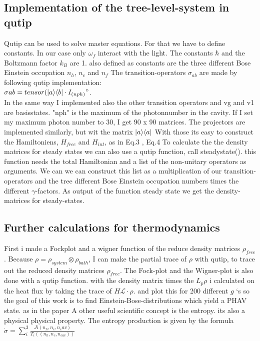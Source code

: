 \documentclass[12pt,a4paper]{article}
\DeclarePairedDelimiter\bra{\langle}{\rvert}
\DeclarePairedDelimiter\ket{\lvert}{\rangle}
\begin{document}
\subsection{Implementation of the tree-level-system in qutip}
Qutip can be used to solve master equations. For that we have to define constants.  
In our case only $\omega_f$ interact with the light. 
The constants $\hbar $ and the Boltzmann factor $k_B$ are 1.
also defined as constants are the three different Bose Einstein occupation $n_h$, $n_c$ and $n_f$
The transition-operators $\sigma_{ab}$ are  made by following qutip implementation:\\ $\sigma_{}ab=tensor(\ket{a}\bra{b}\cdot I_{(nph)}"$.\\
In the same way I implemented also the other transition operators and 
vg and v1 are basisstates.  "nph" is the maximum of the photonnumber in the cavity. If I set my maximum photon number to 30, I get 90 x 90 matrices. 
The projectors are implemented similarly, but wit the matrix $\ket{a}\bra{a}$
With those its easy to construct the Hamiltoniens, $H_{free}$ and $H_{int}$, as in Eq.3 , Eq.4
To calculate the the density matrices for steady states we can also use a qutip function, call steadystate().
this function needs the total Hamiltonian and a list of the non-unitary operators as arguments.
We can we can construct this list as a multiplication of our transition-operators and the tree different Bose Einstein occupation numbers times the different $\gamma$-factors. 
As output of the function steady state we get the density-matrices for steady-states. \cite{Nation2022}
\subsection{Further calculations for thermodynamics}
First i made a Fockplot and a wigner function of the reduce density matrices $\rho_{free}$.
Because $\rho=\rho_{system}\otimes \rho_{bath}$, I can make the partial trace of $\rho$ with qutip, to trace out the reduced density matrices $\rho_{free}$. The Fock-plot and the Wigner-plot is also done with a qutip function.
with the density matrix times the $L_{p}\rho$ i calculated on the heat flux by taking the trace of $H \mathcal{L}\cdot \rho$. 
and plot this for 200 different  $g$ `s 
so the goal of this work is to find Einstein-Bose-distributions which yield a PHAV state.
as in the paper \cite{Allevi2013} 
A other useful scientific concept is the entropy. its also a physical physical property. 
The entropy production is given by the formula $\dot{\sigma}=\sum_i ^3 \frac{Ji(n_h,n_c,n_cav)}{T_i((n_h,n_c,n_{cav}))}$
\end{document}
